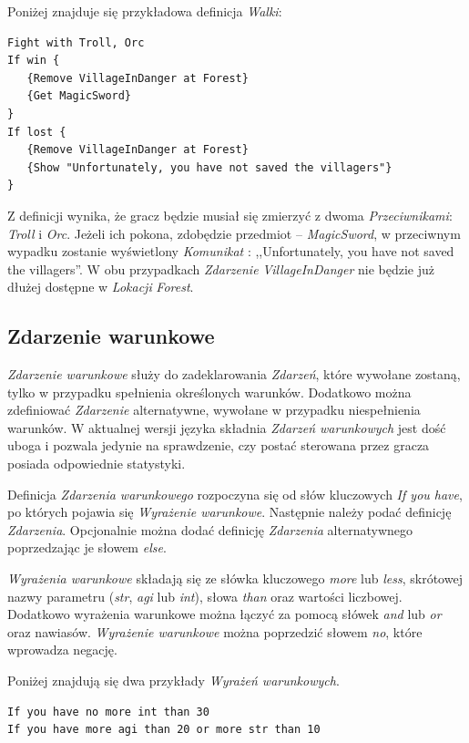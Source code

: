 \documentclass[openright]{xmgr}
\begin{document}
Poniżej znajduje się przykładowa definicja \textit{Walki}:
\begin{verbatim}
Fight with Troll, Orc
If win {
   {Remove VillageInDanger at Forest}
   {Get MagicSword}
}
If lost {
   {Remove VillageInDanger at Forest}
   {Show "Unfortunately, you have not saved the villagers"}
}
\end{verbatim}

Z definicji wynika, że gracz będzie musiał się zmierzyć z dwoma \textit{Przeciwnikami}: \textit{Troll} i \textit{Orc}. Jeżeli ich pokona, zdobędzie przedmiot -- \textit{MagicSword}, w przeciwnym wypadku zostanie wyświetlony \textit{Komunikat} : ,,Unfortunately, you have not saved the villagers''. W obu przypadkach \textit{Zdarzenie} \textit{VillageInDanger} nie będzie już dłużej dostępne w \textit{Lokacji} \textit{Forest}.

\subsection*{Zdarzenie warunkowe}
\textit{Zdarzenie warunkowe} służy do zadeklarowania \textit{Zdarzeń}, które wywołane zostaną, tylko w przypadku spełnienia określonych warunków. Dodatkowo można zdefiniować \textit{Zdarzenie} alternatywne, wywołane w przypadku niespełnienia warunków. W aktualnej wersji języka składnia \textit{Zdarzeń warunkowych} jest dość uboga i pozwala jedynie na sprawdzenie, czy postać sterowana przez gracza posiada odpowiednie statystyki.

Definicja \textit{Zdarzenia warunkowego} rozpoczyna się od słów kluczowych \textit{If you have}, po których pojawia się \textit{Wyrażenie warunkowe}. Następnie należy podać definicję \textit{Zdarzenia}. Opcjonalnie można dodać definicję \textit{Zdarzenia} alternatywnego poprzedzając je słowem \textit{else}.

\textit{Wyrażenia warunkowe} składają się ze słówka kluczowego \textit{more} lub \textit{less}, skrótowej nazwy parametru (\textit{str}, \textit{agi} lub \textit{int}), słowa \textit{than} oraz wartości liczbowej. Dodatkowo wyrażenia warunkowe można łączyć za pomocą słówek \textit{and} lub \textit{or} oraz nawiasów. \textit{Wyrażenie warunkowe} można poprzedzić słowem \textit{no}, które wprowadza negację.

Poniżej znajdują się dwa przykłady \textit{Wyrażeń warunkowych}.
\begin{verbatim}
If you have no more int than 30
If you have more agi than 20 or more str than 10
\end{verbatim}
\end{document}
